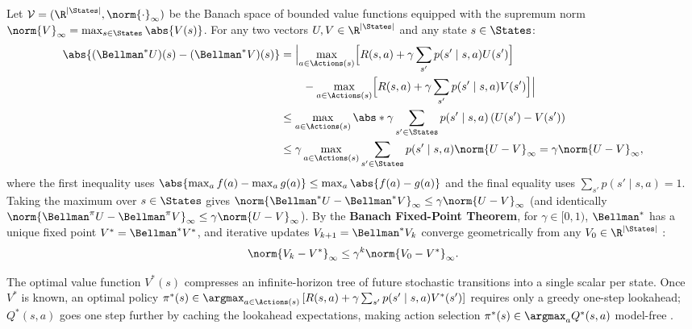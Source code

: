 \documentclass[../../../../master.tex]{subfiles}
\begin{document}
\begin{coremath}
Let $\mathcal{V} = (\R^{|\States|}, \norm{\cdot}_\infty)$ be the Banach space of bounded value functions equipped with the supremum norm $\norm{V}_\infty = \max_{s \in \States} \abs{V(s)}$. For any two vectors $U, V \in \R^{|\States|}$ and any state $s \in \States$:
\begin{align}
  \abs{(\Bellman^* U)(s) - (\Bellman^* V)(s)}
  &= \Bigl|\max_{a \in \Actions(s)} \Bigl[ R(s, a) + \gamma \sum_{s'} p(s' \mid s, a) U(s') \Bigr] \nonumber \\
  &\qquad - \max_{a \in \Actions(s)} \Bigl[ R(s, a) + \gamma \sum_{s'} p(s' \mid s, a) V(s') \Bigr]\Bigr| \nonumber \\
  &\le \max_{a \in \Actions(s)} \abs*{\gamma \sum_{s' \in \States} p(s' \mid s, a)\left(U(s') - V(s')\right)} \nonumber \\
  &\le \gamma \max_{a \in \Actions(s)} \sum_{s' \in \States} p(s' \mid s, a) \norm{U - V}_\infty = \gamma \norm{U - V}_\infty, \label{eq:mdp:contraction_proof}
\end{align}
where the first inequality uses $\abs{\max_a f(a) - \max_a g(a)} \le \max_a \abs{f(a) - g(a)}$ and the final equality uses $\sum_{s'} p(s' \mid s, a) = 1$. Taking the maximum over $s \in \States$ gives $\norm{\Bellman^* U - \Bellman^* V}_\infty \le \gamma \norm{U - V}_\infty$ (and identically $\norm{\Bellman^\pi U - \Bellman^\pi V}_\infty \le \gamma \norm{U - V}_\infty$). By the \textbf{Banach Fixed-Point Theorem}, for $\gamma \in [0, 1)$, $\Bellman^*$ has a unique fixed point $V^* = \Bellman^* V^*$, and iterative updates $V_{k+1} = \Bellman^* V_k$ converge geometrically from any $V_0 \in \R^{|\States|}$ :
\begin{equation}\label{eq:mdp:banach_rate}
  \norm{V_k - V^*}_\infty \le \gamma^k \norm{V_0 - V^*}_\infty.
\end{equation}
\end{coremath}

\begin{intuition}
The optimal value function $V^*(s)$ compresses an infinite-horizon tree of future stochastic transitions into a single scalar per state. Once $V^*$ is known, an optimal policy $\pi^*(s) \in \argmax_{a \in \Actions(s)} \left[R(s,a) + \gamma \sum_{s'} p(s' \mid s, a) V^*(s')\right]$ requires only a greedy one-step lookahead; $Q^*(s, a)$ goes one step further by caching the lookahead expectations, making action selection $\pi^*(s) \in \argmax_a Q^*(s, a)$ model-free .
\end{intuition}
\end{document}

